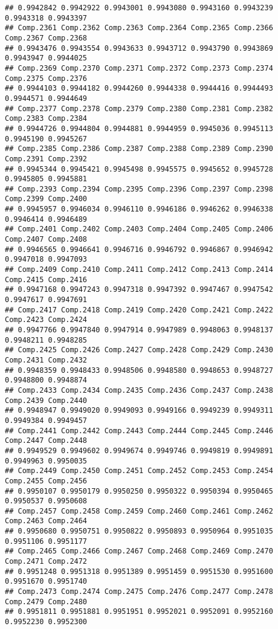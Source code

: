 \documentclass[
]{article}
\begin{document}
\begin{verbatim}
## 0.9942842 0.9942922 0.9943001 0.9943080 0.9943160 0.9943239 0.9943318 0.9943397 
## Comp.2361 Comp.2362 Comp.2363 Comp.2364 Comp.2365 Comp.2366 Comp.2367 Comp.2368 
## 0.9943476 0.9943554 0.9943633 0.9943712 0.9943790 0.9943869 0.9943947 0.9944025 
## Comp.2369 Comp.2370 Comp.2371 Comp.2372 Comp.2373 Comp.2374 Comp.2375 Comp.2376 
## 0.9944103 0.9944182 0.9944260 0.9944338 0.9944416 0.9944493 0.9944571 0.9944649 
## Comp.2377 Comp.2378 Comp.2379 Comp.2380 Comp.2381 Comp.2382 Comp.2383 Comp.2384 
## 0.9944726 0.9944804 0.9944881 0.9944959 0.9945036 0.9945113 0.9945190 0.9945267 
## Comp.2385 Comp.2386 Comp.2387 Comp.2388 Comp.2389 Comp.2390 Comp.2391 Comp.2392 
## 0.9945344 0.9945421 0.9945498 0.9945575 0.9945652 0.9945728 0.9945805 0.9945881 
## Comp.2393 Comp.2394 Comp.2395 Comp.2396 Comp.2397 Comp.2398 Comp.2399 Comp.2400 
## 0.9945957 0.9946034 0.9946110 0.9946186 0.9946262 0.9946338 0.9946414 0.9946489 
## Comp.2401 Comp.2402 Comp.2403 Comp.2404 Comp.2405 Comp.2406 Comp.2407 Comp.2408 
## 0.9946565 0.9946641 0.9946716 0.9946792 0.9946867 0.9946942 0.9947018 0.9947093 
## Comp.2409 Comp.2410 Comp.2411 Comp.2412 Comp.2413 Comp.2414 Comp.2415 Comp.2416 
## 0.9947168 0.9947243 0.9947318 0.9947392 0.9947467 0.9947542 0.9947617 0.9947691 
## Comp.2417 Comp.2418 Comp.2419 Comp.2420 Comp.2421 Comp.2422 Comp.2423 Comp.2424 
## 0.9947766 0.9947840 0.9947914 0.9947989 0.9948063 0.9948137 0.9948211 0.9948285 
## Comp.2425 Comp.2426 Comp.2427 Comp.2428 Comp.2429 Comp.2430 Comp.2431 Comp.2432 
## 0.9948359 0.9948433 0.9948506 0.9948580 0.9948653 0.9948727 0.9948800 0.9948874 
## Comp.2433 Comp.2434 Comp.2435 Comp.2436 Comp.2437 Comp.2438 Comp.2439 Comp.2440 
## 0.9948947 0.9949020 0.9949093 0.9949166 0.9949239 0.9949311 0.9949384 0.9949457 
## Comp.2441 Comp.2442 Comp.2443 Comp.2444 Comp.2445 Comp.2446 Comp.2447 Comp.2448 
## 0.9949529 0.9949602 0.9949674 0.9949746 0.9949819 0.9949891 0.9949963 0.9950035 
## Comp.2449 Comp.2450 Comp.2451 Comp.2452 Comp.2453 Comp.2454 Comp.2455 Comp.2456 
## 0.9950107 0.9950179 0.9950250 0.9950322 0.9950394 0.9950465 0.9950537 0.9950608 
## Comp.2457 Comp.2458 Comp.2459 Comp.2460 Comp.2461 Comp.2462 Comp.2463 Comp.2464 
## 0.9950680 0.9950751 0.9950822 0.9950893 0.9950964 0.9951035 0.9951106 0.9951177 
## Comp.2465 Comp.2466 Comp.2467 Comp.2468 Comp.2469 Comp.2470 Comp.2471 Comp.2472 
## 0.9951248 0.9951318 0.9951389 0.9951459 0.9951530 0.9951600 0.9951670 0.9951740 
## Comp.2473 Comp.2474 Comp.2475 Comp.2476 Comp.2477 Comp.2478 Comp.2479 Comp.2480 
## 0.9951811 0.9951881 0.9951951 0.9952021 0.9952091 0.9952160 0.9952230 0.9952300 

\end{verbatim}
\end{document}
